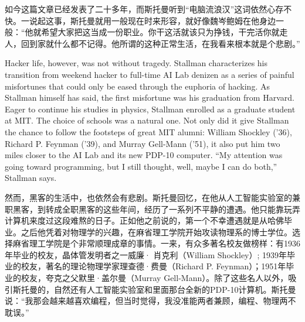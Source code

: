 \ifdefined\chs
如今这篇文章已经发表了二十多年，而斯托曼听到``电脑流浪汉''这词依然心存不快。一说起这事，斯托曼就用一般现在时来形容，就好像魏岑鲍姆在他身边一般：``他就希望大家把这当成一份职业。你干这活就该只为挣钱，干完活你就走人，回到家就什么都不记得。他所谓的这种正常生活，在我看来根本就是个悲剧。''
\fi

\ifdefined\eng
Hacker life, however, was not without tragedy. Stallman characterizes his transition from weekend hacker to full-time AI Lab denizen as a series of painful misfortunes that could only be eased through the euphoria of hacking. As Stallman himself has said, the first misfortune was his graduation from Harvard. Eager to continue his studies in physics, Stallman enrolled as a graduate student at MIT. The choice of schools was a natural one. Not only did it give Stallman the chance to follow the footsteps of great MIT alumni: William Shockley ('36), Richard P. Feynman ('39), and Murray Gell-Mann ('51), it also put him two miles closer to the AI Lab and its new PDP-10 computer. ``My attention was going toward programming, but I still thought, well, maybe I can do both,'' Stallman says.
\fi

\ifdefined\chs
然而，黑客的生活中，也依然会有悲剧。斯托曼回忆，在他从人工智能实验室的兼职黑客，到转成全职黑客的这些年间，经历了一系列不平静的遭遇。他只能靠玩弄计算机来度过这段难熬的日子。正如他之前说的，第一个不幸遭遇就是从哈佛毕业。之后他凭着对物理学的兴趣，在麻省理工学院开始攻读物理系的博士学位。选择麻省理工学院是个非常顺理成章的事情。一来，有众多著名校友做榜样：有1936年毕业的校友，晶体管发明者之一威廉· 肖克利（William Shockley）; 1939年毕业的校友，著名的理论物理学家理查德·费曼（Richard P. Feynman）；1951年毕业的校友，夸克之父默里·盖尔曼（Murray Gell-Mann）。除了这些名人以外，吸引斯托曼的，自然还有人工智能实验室和里面那台全新的PDP-10计算机。斯托曼说：``我那会越来越喜欢编程，但当时觉得，我没准能两者兼顾，编程、物理两不耽误。''
\fi


